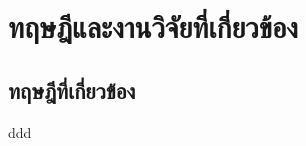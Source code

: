 \chapter{ทฤษฎีและงานวิจัยที่เกี่ยวข้อง}

\section{ทฤษฎีที่เกี่ยวข้อง}
ddd \cite{malishevsky2003test}
